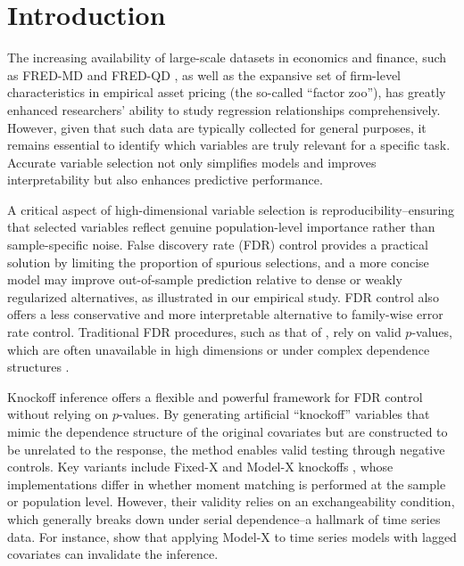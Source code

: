 ﻿\documentclass[12pt]{article}
\newcommand{\0}{\mbox{\bf 0}}
\theoremstyle{plain}%
\theoremstyle{definition}
\begin{document}
\section{Introduction}
\label{sec:intro}
\vspace{-0.1in}


The increasing availability of large-scale datasets in economics and finance, such as FRED-MD and FRED-QD  \citep{McCrackenNg2016,McCrackenNg2020}, as well as the expansive set of firm-level characteristics in empirical asset pricing (the so-called ``factor zoo''), has greatly enhanced researchers' ability to study regression relationships comprehensively. However, given that such data are typically collected for general purposes, it remains essential to identify which variables are truly relevant for a specific task. Accurate variable selection not only simplifies models and improves interpretability but also enhances predictive performance.

A critical aspect of high-dimensional variable selection is reproducibility--ensuring that selected variables reflect genuine population-level importance rather than sample-specific noise. False discovery rate (FDR) control provides a practical solution by limiting the proportion of spurious selections, and a more concise model may improve out-of-sample prediction relative to dense or weakly regularized alternatives, as illustrated in our empirical study. FDR control also offers a less conservative and more interpretable alternative to family-wise error rate control. Traditional FDR procedures, such as that of \citet{BenjaminiHochberg1995}, rely on valid $p$-values, which are often unavailable in high dimensions or under complex dependence structures \cite[e.g.][]{CandesFanEtal2018, FanDemirkayaLv2019}.

Knockoff inference offers a flexible and powerful framework for FDR control without relying on $p$-values. By generating artificial ``knockoff'' variables that mimic the dependence structure of the original covariates but are constructed to be unrelated to the response, the method enables valid testing through negative controls. Key variants include Fixed-X \citep{BarberCandes2015} and Model-X knockoffs \citep{CandesFanEtal2018}, whose implementations differ in whether moment matching is performed at the sample or population level. However, their validity relies on an exchangeability condition, which generally breaks down under serial dependence--a hallmark of time series data. For instance, \citet{ChiFanIngLv2025} show that applying Model-X to time series models with lagged covariates can invalidate the inference.
\end{document}
